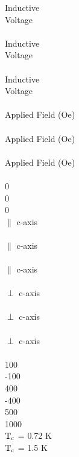 \pagestyle{empty}

Inductive\\
Voltage\\
\\
Inductive\\
Voltage\\
\\
Inductive\\
Voltage\\
\\
Applied Field (Oe)\\
\\
Applied Field (Oe)\\
\\
Applied Field (Oe)\\
\\
0\\
0\\
0\\
$\parallel$ c-axis\\
\\
$\parallel$ c-axis\\
\\
$\parallel$ c-axis\\
\\
$\perp$ c-axis\\
\\
$\perp$ c-axis\\
\\
$\perp$ c-axis\\
\\
100\\
-100\\
400\\
-400\\
500\\
1000\\
$\rm T_c$ = 0.72 K\\
$\rm T_c$ = 1.5 K\\

